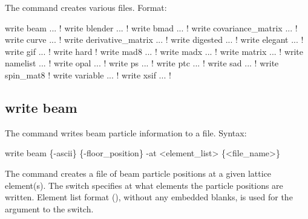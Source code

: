 {{{{{{{{{{{The  command creates various files.
Format:
\begin{example}
  write beam ...                  ! 
  write blender ...               ! 
  write bmad ...                  ! 
  write covariance_matrix ...     ! 
  write curve ...                 ! 
  write derivative_matrix ...     ! 
  write digested ...              ! 
  write elegant ...               ! 
  write gif ...                   ! 
  write hard                      ! 
  write mad8 ...                  ! 
  write madx ...                  ! 
  write matrix ...                ! 
  write namelist ...              ! 
  write opal ...                  ! 
  write ps ...                    !   
  write ptc ...                   ! 
  write sad ...                   ! 
  write spin_mat8                 ! 
  write variable ...              ! 
  write xsif ...                  ! 
\end{example}



\subsection{write beam}
\label{s:write.beam}

The  command writes beam particle information to a file.
Syntax:
\begin{example}
    write beam \{-ascii\} \{-floor_position\} -at <element_list> \{<file_name>\} 
\end{example}

The  command creates a file of beam particle positions at a given lattice element(s). The
 switch specifies at what elements the particle positions are written. Element list format
(), without any embedded blanks, is used for the 
argument to the  switch. 

}}}}}}}}}}}
